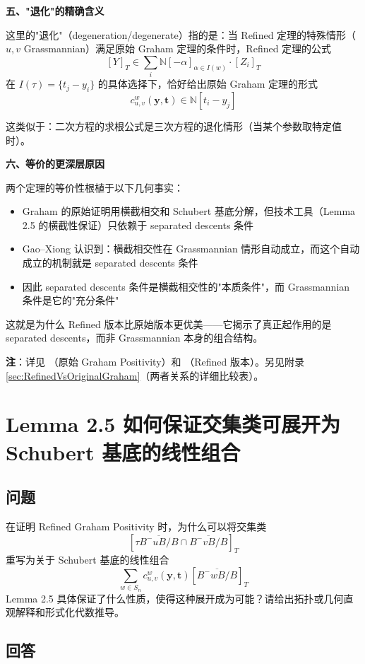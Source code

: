 \textbf{五、"退化"的精确含义}

这里的"退化"（degeneration/degenerate）指的是：当 Refined 定理的特殊情形（$u, v$ Grassmannian）满足原始 Graham 定理的条件时，Refined 定理的公式
$$[Y]_T \in \sum_i \mathbb{N}[-\alpha]_{\alpha \in I(w)} \cdot [Z_i]_T$$
在 $I(\tau) = \{t_j - y_i\}$ 的具体选择下，恰好给出原始 Graham 定理的形式
$$c^w_{u,v}(\mathbf{y}, \mathbf{t}) \in \mathbb{N}[t_i - y_j]$$

这类似于：二次方程的求根公式是三次方程的退化情形（当某个参数取特定值时）。

\textbf{六、等价的更深层原因}

两个定理的等价性根植于以下几何事实：

\begin{itemize}
\item Graham 的原始证明用横截相交和 Schubert 基底分解，但技术工具（Lemma 2.5 的横截性保证）只依赖于 separated descents 条件
\item Gao--Xiong \cite{GX2025} 认识到：横截相交性在 Grassmannian 情形自动成立，而这个自动成立的机制就是 separated descents 条件
\item 因此 separated descents 条件是横截相交性的"本质条件"，而 Grassmannian 条件是它的"充分条件"
\end{itemize}

这就是为什么 Refined 版本比原始版本更优美——它揭示了真正起作用的是 separated descents，而非 Grassmannian 本身的组合结构。

\textbf{注}：详见 \cite{Gr}（原始 Graham Positivity）和 \cite[Section 2]{GX2025}（Refined 版本）。另见附录 \cref{sec:RefinedVsOriginalGraham}（两者关系的详细比较表）。

\section{Lemma 2.5 如何保证交集类可展开为 Schubert 基底的线性组合}\label{sec:qa-Lemma25-expand}
\subsection{问题}
在证明 Refined Graham Positivity 时，为什么可以将交集类
$$[\tau \overline{B^-uB/B} \cap \overline{B^-vB/B}]_T$$
重写为关于 Schubert 基底的线性组合
$$\sum_{w \in S_n} c^w_{u,v}(\mathbf{y}, \mathbf{t})[\overline{B^-wB/B}]_T$$
Lemma 2.5 具体保证了什么性质，使得这种展开成为可能？请给出拓扑或几何直观解释和形式化代数推导。

\subsection{回答}

